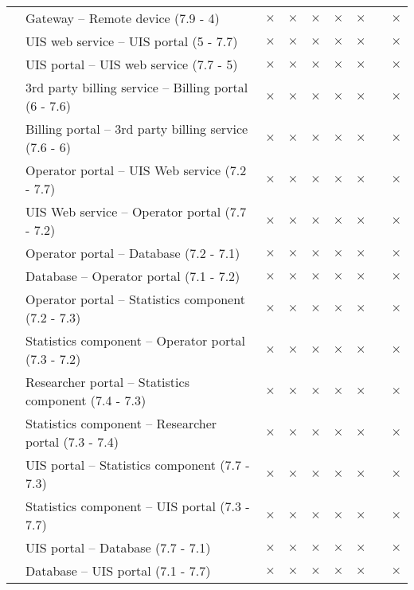 \begin{table}[h!]
\begin{center}
\begin{longtable}{p{2.3cm} p{9cm} p{0.2cm} p{0.2cm} p{0.2cm} p{0.2cm}p{0.2cm} p{0.2cm} p{0.2cm} }
		   &  Gateway -- Remote device (7.9 - 4) & $\times$ & $\times$ & $\times$& $\times$ &  $\times$ & & $\times$\\
		   &  UIS web service -- UIS portal (5 - 7.7) & $\times$ & $\times$ & $\times$& $\times$ &  $\times$ & & $\times$\\
		   &  UIS portal -- UIS web service (7.7 - 5) & $\times$ & $\times$ & $\times$& $\times$ &  $\times$ & & $\times$\\
		   &  3rd party billing service -- Billing portal (6 - 7.6) & $\times$ & $\times$ & $\times$& $\times$ &  $\times$ & & $\times$\\
		   & Billing portal --  3rd party billing service (7.6 - 6) & $\times$ & $\times$ & $\times$& $\times$ &  $\times$ & & $\times$\\
		   &  Operator portal  -- UIS Web service (7.2 - 7.7) & $\times$ & $\times$ & $\times$& $\times$ &  $\times$ & & $\times$\\
		   &  UIS Web service -- Operator portal (7.7 - 7.2) & $\times$ & $\times$ & $\times$& $\times$ &  $\times$ & & $\times$\\
		   &  Operator portal -- Database (7.2 - 7.1) & $\times$ & $\times$ & $\times$& $\times$ &  $\times$ & & $\times$\\
		   &  Database -- Operator portal (7.1 - 7.2) & $\times$ & $\times$ & $\times$& $\times$ &  $\times$ & & $\times$\\
		   &  Operator portal -- Statistics component (7.2 - 7.3) & $\times$ & $\times$ & $\times$& $\times$ &  $\times$ & & $\times$\\
		   &  Statistics component -- Operator portal (7.3 - 7.2) & $\times$ & $\times$ & $\times$& $\times$ &  $\times$ & & $\times$\\
		   &  Researcher portal -- Statistics component (7.4 - 7.3) & $\times$ & $\times$ & $\times$& $\times$ &  $\times$ & & $\times$\\
		   &  Statistics component -- Researcher portal (7.3 - 7.4) & $\times$ & $\times$ & $\times$& $\times$ &  $\times$ & & $\times$\\
		   &  UIS portal -- Statistics component (7.7 - 7.3) & $\times$ & $\times$ & $\times$& $\times$ &  $\times$ & & $\times$\\
		   &  Statistics component -- UIS portal (7.3 - 7.7) & $\times$ & $\times$ & $\times$& $\times$ &  $\times$ & & $\times$\\
		   &  UIS portal -- Database (7.7 - 7.1) & $\times$ & $\times$ & $\times$& $\times$ &  $\times$ & & $\times$\\
		   &  Database -- UIS portal (7.1 - 7.7) & $\times$ & $\times$ & $\times$& $\times$ &  $\times$ & & $\times$\\
		   

\end{longtable}
\end{center}
\end{table}
